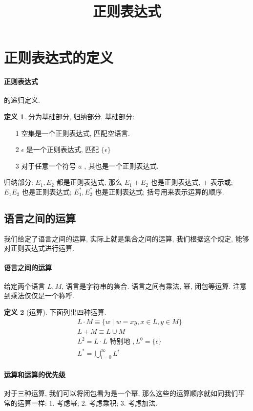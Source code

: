 \documentclass[12pt]{ctexart}
\theoremstyle{definition}
\theoremstyle{definition}
\newtheorem{definition}{定义}[section]
\theoremstyle{plain}
\begin{document}
\title{正则表达式}
\tableofcontents

\section{正则表达式的定义}%
\paragraph{正则表达式} 的递归定义. 
\begin{definition}
分为基础部分, 归纳部分. 基础部分:
\begin{itemize}
\item [1] 
空集是一个正则表达式, 匹配空语言. 
\item [2] \(\epsilon\) 是一个正则表达式, 匹配 \(\{ \epsilon \}\)
\item [3] 对于任意一个符号 \(a\) , 其也是一个正则表达式. 
\end{itemize}
归纳部分: \(E_{1}, E_{2}\) 都是正则表达式, 那么 \(E_{1} + E_{2}\) 也是正则表达式,  \(+\) 表示或; \(E_{1} E_{2} \) 也是正则表达式; \(E_{1} ^{*}, E_{2} ^{*}\) 也是正则表达式; 括号用来表示运算的顺序. 
\end{definition}

\subsection{语言之间的运算}
我们给定了语言之间的运算, 实际上就是集合之间的运算, 我们根据这个规定, 能够对正则表达式进行运算. 
\paragraph{语言之间的运算}
给定两个语言 \(L, M\), 语言是字符串的集合. 语言之间有乘法, 幂, 闭包等运算. 注意到乘法仅仅是一个称呼. 
\begin{definition}[运算] 下面列出四种运算. \\ 
\[
\begin{aligned}
& L \cdot M \equiv \{ w \mid w = xy , x \in L , y \in M\} \\
& L + M \equiv L \cup M \\
& L^{2} = L \cdot L \text{ 特别地 }, L ^{0} = \{\epsilon\}\\
& L ^{*} = \bigcup_{i= 0 } ^{\infty} L ^{i}
\end{aligned}
\]
\end{definition}

\paragraph{运算和运算的优先级}
对于三种运算, 我们可以将闭包看为是一个幂, 那么这些的运算顺序就如同我们平常的运算一样: 1. 考虑幂; 2. 考虑乘积; 3. 考虑加法.
\end{document}
